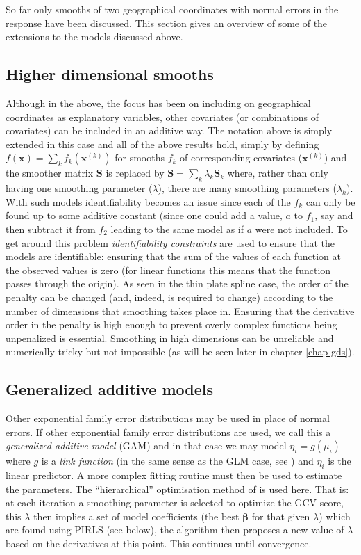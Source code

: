 So far only smooths of two geographical coordinates with normal errors in the response have been discussed. This section gives an overview of some of the extensions to the models discussed above.

\subsection{Higher dimensional smooths}

Although in the above, the focus has been on including on geographical coordinates as explanatory variables, other covariates (or combinations of covariates) can be included in an additive way. The notation above is simply extended in this case and all of the above results hold, simply by defining $f(\mathbf{x})=\sum_k f_k(\mathbf{x}^{(k)})$ for smooths $f_k$ of corresponding covariates ($\mathbf{x}^{(k)}$) and the smoother matrix $\mathbf{S}$ is replaced by $\mathbf{S}= \sum_k \lambda_k \mathbf{S}_k$ where, rather than only having one smoothing parameter ($\lambda$), there are many smoothing parameters ($\lambda_k$). With such models identifiability becomes an issue since each of the $f_k$ can only be found up to some additive constant (since one could add a value, $a$ to $f_1$, say and then subtract it from $f_2$ leading to the same model as if $a$ were not included. To get around this problem \textit{identifiability constraints} are used to ensure that the models are identifiable: ensuring that the sum of the values of each function at the observed values is zero (for linear functions this means that the function passes through the origin). As seen in the thin plate spline case, the order of the penalty can be changed (and, indeed, is required to change) according to the number of dimensions that smoothing takes place in. Ensuring that the derivative order in the penalty is high enough to prevent overly complex functions being unpenalized is essential. Smoothing in high dimensions can be unreliable and numerically tricky but not impossible (as will be seen later in chapter \ref{chap-gds}).

\subsection{Generalized additive models}
\label{intro-extending-gams}

Other exponential family error distributions may be used in place of normal errors. If other exponential family error distributions are used, we call this a \textit{generalized additive model} (GAM)  and in that case we may model $\eta_i=g(\mu_i)$ where $g$ is a \textit{link function} (in the same sense as the GLM case, see \cite[p. 8]{GEEbook}) and $\eta_i$ is the linear predictor. A more complex fitting routine must then be used to estimate the parameters. The ``hierarchical'' optimisation method of  is used here. That is: at each iteration a smoothing parameter is selected to optimize the GCV score, this $\lambda$ then implies a set of model coefficients (the best $\bm{\beta}$ for that given $\lambda$) which are found using PIRLS (see below), the algorithm then proposes a new value of $\lambda$ based on the derivatives at this point. This continues until convergence.

